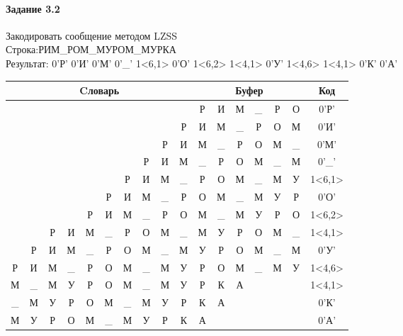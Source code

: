 \documentclass[a4paper, 12pt]{article}
\begin{document}
\paragraph{Задание 3.2}

Закодировать сообщение методом LZSS\\
Строка:РИМ\_РОМ\_МУРОМ\_МУРКА\\
Результат: 0'Р' 0'И' 0'М' 0'\_' 1<6,1> 0'О' 1<6,2> 1<4,1> 0'У' 1<4,6> 1<4,1> 0'К' 0'А'\\
\begin{table}[h!]
\centering
\begin{tabular}{|c|c|c|c|c|c|c|c|c|c|c|c|c|c|c|c|c|}
\hline
\multicolumn{10}{|c|}{Cловарь} & \multicolumn{6}{c|}{Буфер} & Код  \\ \hline
  &   &   &   &   &   &   &   &   &   & Р & И & М & \_ & Р & О & 0'Р'\\ \hline
  &   &   &   &   &   &   &   &   & Р & И & М & \_ & Р & О & М & 0'И'\\ \hline
  &   &   &   &   &   &   &   & Р & И & М & \_ & Р & О & М & \_ & 0'М'\\ \hline
  &   &   &   &   &   &   & Р & И & М & \_ & Р & О & М & \_ & М & 0'\_'\\ \hline
  &   &   &   &   &   & \cellcolor[HTML]{FFFF00} Р & И & М & \_ & \cellcolor[HTML]{FFFF00} Р & О & М & \_ & М & У & 1<6,1>\\ \hline
  &   &   &   &   & Р & И & М & \_ & Р & О & М & \_ & М & У & Р & 0'О'\\ \hline
  &   &   &   & Р & И & \cellcolor[HTML]{FFFF00} М & \cellcolor[HTML]{FFFF00} \_ & Р & О & \cellcolor[HTML]{FFFF00} М & \cellcolor[HTML]{FFFF00} \_ & М & У & Р & О & 1<6,2>\\ \hline
  &   & Р & И & \cellcolor[HTML]{FFFF00} М & \_ & Р & О & М & \_ & \cellcolor[HTML]{FFFF00} М & У & Р & О & М & \_ & 1<4,1>\\ \hline
  & Р & И & М & \_ & Р & О & М & \_ & М & У & Р & О & М & \_ & М & 0'У'\\ \hline
Р & И & М & \_ & \cellcolor[HTML]{FFFF00} Р & \cellcolor[HTML]{FFFF00} О & \cellcolor[HTML]{FFFF00} М & \cellcolor[HTML]{FFFF00} \_ & \cellcolor[HTML]{FFFF00} М & \cellcolor[HTML]{FFFF00} У & \cellcolor[HTML]{FFFF00} Р & \cellcolor[HTML]{FFFF00} О & \cellcolor[HTML]{FFFF00} М & \cellcolor[HTML]{FFFF00} \_ & \cellcolor[HTML]{FFFF00} М & \cellcolor[HTML]{FFFF00} У & 1<4,6>\\ \hline
М & \_ & М & У & \cellcolor[HTML]{FFFF00} Р & О & М & \_ & М & У & \cellcolor[HTML]{FFFF00} Р & К & А &   &   &   & 1<4,1>\\ \hline
\_ & М & У & Р & О & М & \_ & М & У & Р & К & А &   &   &   &   & 0'К'\\ \hline
М & У & Р & О & М & \_ & М & У & Р & К & А &   &   &   &   &   & 0'А'\\ \hline
\end{tabular}
\end{table}
\end{document}
